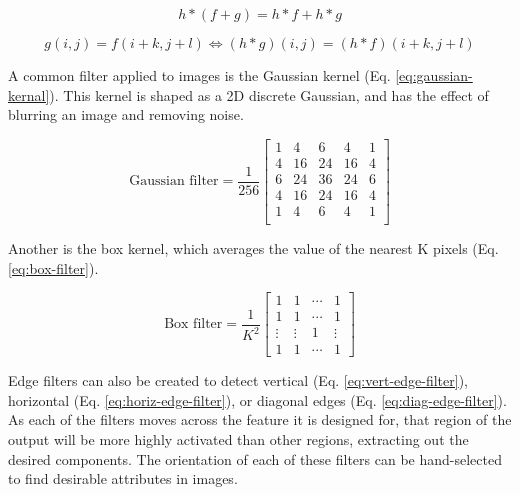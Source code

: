 \begin{equation}
    h *(f + g) = h*f + h*g
    \label{eq:superposition}
\end{equation}

\begin{equation}
    g(i,j) = f(i+k,j+l) \Longleftrightarrow (h*g)(i,j) = (h*f)(i+k,j+l)
    \label{eq:shift-invariance}
\end{equation}

A common filter applied to images is the Gaussian kernel (Eq. \ref{eq:gaussian-kernal}). This kernel is shaped as a 2D discrete Gaussian, and has the effect of blurring an image and removing noise.

\begin{equation}
    \text{Gaussian filter}=\frac{1}{256}\begin{bmatrix}
        1 & 4 & 6 & 4 & 1 \\
        4 & 16 & 24 & 16 & 4\\
        6 & 24 & 36 & 24 & 6\\
        4 & 16 & 24 & 16 & 4\\
        1 & 4 & 6 & 4 & 1 \\
    \end{bmatrix}
    \label{eq:gaussian-kernal}
\end{equation}

Another is the box kernel, which averages the value of the nearest K pixels (Eq. \ref{eq:box-filter}).

\begin{equation}
    \text{Box filter} = \frac{1}{K^{2}}\begin{bmatrix}
        1 & 1 & \cdots &1\\
        1 & 1 & \cdots &1 \\
        \vdots & \vdots & 1 & \vdots \\
        1 & 1 & \cdots & 1
    \end{bmatrix}
    \label{eq:box-filter}
\end{equation}

Edge filters can also be created to detect vertical (Eq. \ref{eq:vert-edge-filter}), horizontal (Eq. \ref{eq:horiz-edge-filter}), or diagonal edges (Eq. \ref{eq:diag-edge-filter}). As each of the filters moves across the feature it is designed for, that region of the output will be more highly activated than other regions, extracting out the desired components. The orientation of each of these filters can be hand-selected to find desirable attributes in images.

